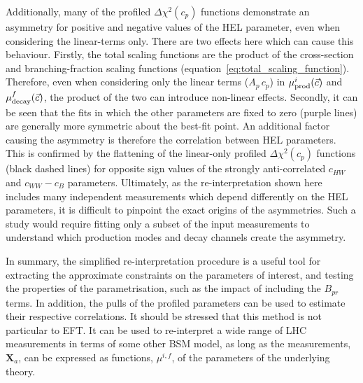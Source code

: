 Additionally, many of the profiled $\Delta\chi^2(c_p)$ functions demonstrate an asymmetry for positive and negative values of the HEL parameter, even when considering the linear-terms only. There are two effects here which can cause this behaviour. Firstly, the total scaling functions are the product of the cross-section and branching-fraction scaling functions (equation~\ref{eq:total_scaling_function}). Therefore, even when considering only the linear terms ($A_p\,c_p$) in $\mu^i_{\rm{prod}}(\vec{c})$ and $\mu^f_{\rm{decay}}(\vec{c})$, the product of the two can introduce non-linear effects. Secondly, it can be seen that the fits in which the other parameters are fixed to zero (purple lines) are generally more symmetric about the best-fit point. An additional factor causing the asymmetry is therefore the correlation between HEL parameters. This is confirmed by the flattening of the linear-only profiled $\Delta\chi^2(c_p)$ functions (black dashed lines) for opposite sign values of the strongly anti-correlated $c_{HW}$ and $c_{WW}-c_B$ parameters. Ultimately, as the re-interpretation shown here includes many independent measurements which depend differently on the HEL parameters, it is difficult to pinpoint the exact origins of the asymmetries. Such a study would require fitting only a subset of the input measurements to understand which production modes and decay channels create the asymmetry.

In summary, the simplified re-interpretation procedure is a useful tool for extracting the approximate constraints on the parameters of interest, and testing the properties of the parametrisation, such as the impact of including the $B_{pr}$ terms. In addition, the pulls of the profiled parameters can be used to estimate their respective correlations. It should be stressed that this method is not particular to EFT. It can be used to re-interpret a wide range of LHC measurements in terms of some other BSM model, as long as the measurements, $\mathbf{X}_a$, can be expressed as functions, $\mu^{i,f}$, of the parameters of the underlying theory.

\FloatBarrier
